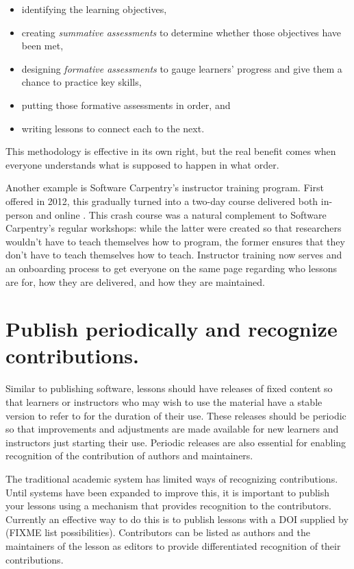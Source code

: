 \documentclass[10pt,letterpaper]{article}
\newcommand{\rulemajor}[1]{\section{#1}}
\begin{document}
\begin{itemize}

\item
  identifying the learning objectives,

\item
  creating \emph{summative assessments} to determine whether those objectives have been met,

\item
  designing \emph{formative assessments} to gauge learners' progress
  and give them a chance to practice key skills,

\item
  putting those formative assessments in order,
  and

\item
  writing lessons to connect each to the next.

\end{itemize}

This methodology is effective in its own right,
but the real benefit comes when everyone understands what is supposed to happen
in what order.

Another example is Software Carpentry's instructor training program.
First offered in 2012,
this gradually turned into a two-day course delivered both in-person and online
\cite{lessons-learned}.
This crash course was a natural complement to Software Carpentry's regular workshops:
while the latter were created so that researchers wouldn't have to teach themselves how to program,
the former ensures that they don't have to teach themselves how to teach.
Instructor training now serves and an onboarding process to get everyone on the same page
regarding who lessons are for,
how they are delivered,
and how they are maintained.

\rulemajor{Publish periodically and recognize contributions.}

Similar to publishing software,
lessons should have releases of fixed content
so that learners or instructors who may wish to use the material have a stable version to refer to
for the duration of their use.
These releases should be periodic
so that improvements and adjustments are made available
for new learners and instructors just starting their use.
Periodic releases are also essential
for enabling recognition of the contribution of authors and maintainers.

The traditional academic system has limited ways of recognizing contributions.
Until systems have been expanded to improve this,
it is important to publish your lessons using a mechanism that provides recognition to the contributors.
Currently an effective way to do this is
to publish lessons with a DOI supplied by (FIXME list possibilities).
Contributors can be listed as authors
and the maintainers of the lesson as editors
to provide differentiated recognition of their contributions.
\end{document}
